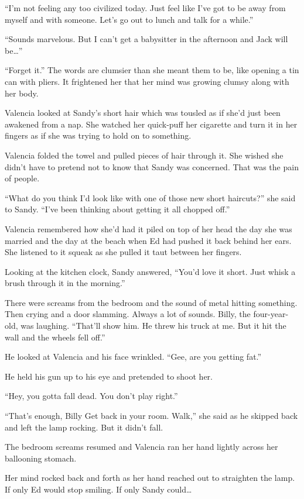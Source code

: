\documentclass[twoside,10pt]{book}
\begin{document}
``I'm not feeling any too civilized today. Just feel like I've got to be
away from myself and with someone. Let's go out to lunch and talk for a
while.''

``Sounds marvelous. But I can't get a babysitter in the afternoon and
Jack will be\ldots''

``Forget it.'' The words are clumsier than she meant them to be, like
opening a tin can with pliers. It frightened her that her mind was
growing clumsy along with her body.

Valencia looked at Sandy's short hair which was tousled as if she'd just
been awakened from a nap. She watched her quick-puff her cigarette and
turn it in her fingers as if she was trying to hold on to something.

Valencia folded the towel and pulled pieces of hair through it. She
wished she didn't have to pretend not to know that Sandy was concerned.
That was the pain of people.

``What do you think I'd look like with one of those new short
haircuts?'' she said to Sandy. ``I've been thinking about getting it all
chopped off.''

Valencia remembered how she'd had it piled on top of her head the day
she was married and the day at the beach when Ed had pushed it back
behind her ears. She listened to it squeak as she pulled it taut between
her fingers.

Looking at the kitchen clock, Sandy answered, ``You'd love it short.
Just whisk a brush through it in the morning.''

There were screams from the bedroom and the sound of metal hitting
something. Then crying and a door slamming. Always a lot of sounds.
Billy, the four-year-old, was laughing. ``That'll show him. He threw his
truck at me. But it hit the wall and the wheels fell off.''

He looked at Valencia and his face wrinkled. ``Gee, are you getting
fat.''

He held his gun up to his eye and pretended to shoot her.

``Hey, you gotta fall dead. You don't play right.''

``That's enough, Billy Get back in your room. Walk,'' she said as he
skipped back and left the lamp rocking. But it didn't fall.

The bedroom screams resumed and Valencia ran her hand lightly across her
ballooning stomach.

Her mind rocked back and forth as her hand reached out to straighten the
lamp. If only Ed would stop smiling. If only Sandy could\ldots{}
\end{document}
